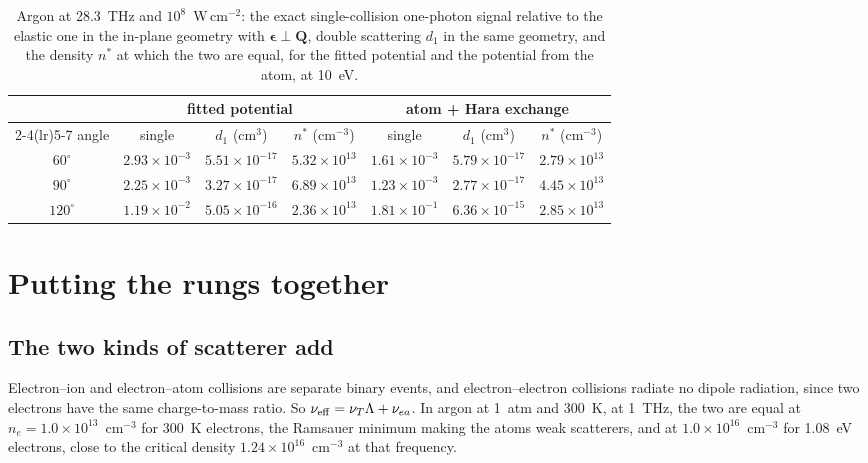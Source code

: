 \documentclass[11pt]{article}
\numberwithin{equation}{section}
\newcommand{\nueff}{\nu_{\rm eff}}
\begin{document}
\begin{table}[ht]
\caption{Argon at 28.3~THz and $10^8$~W\,cm$^{-2}$: the exact single-collision one-photon signal
relative to the elastic one in the in-plane geometry with $\boldsymbol\epsilon\perp\mathbf Q$, double
scattering $d_1$ in the same geometry, and the density $n^*$ at which the two are equal, for the
fitted potential and the potential from the atom, at 10~eV.}
\label{tab:onetwo}
\begin{center}
\begin{tabular}{ccccccc}
\toprule
& \multicolumn{3}{c}{fitted potential} & \multicolumn{3}{c}{atom + Hara exchange}\\
\cmidrule(lr){2-4}\cmidrule(lr){5-7}
angle & single & $d_1$ (cm$^3$) & $n^*$ (cm$^{-3}$) & single & $d_1$ (cm$^3$) & $n^*$ (cm$^{-3}$)\\
\midrule
$60^\circ$ & $2.93\times10^{-3}$ & $5.51\times10^{-17}$ & $5.32\times10^{13}$ & $1.61\times10^{-3}$ & $5.79\times10^{-17}$ & $2.79\times10^{13}$\\
$90^\circ$ & $2.25\times10^{-3}$ & $3.27\times10^{-17}$ & $6.89\times10^{13}$ & $1.23\times10^{-3}$ & $2.77\times10^{-17}$ & $4.45\times10^{13}$\\
$120^\circ$ & $1.19\times10^{-2}$ & $5.05\times10^{-16}$ & $2.36\times10^{13}$ & $1.81\times10^{-1}$ & $6.36\times10^{-15}$ & $2.85\times10^{13}$\\
\bottomrule
\end{tabular}
\end{center}
\end{table}

\section{Putting the rungs together}
\label{sec:standard}

\subsection{The two kinds of scatterer add}
\label{sec:add}
Electron--ion and electron--atom collisions are separate binary events, and
electron--electron collisions radiate no dipole radiation, since two electrons have the same
charge-to-mass ratio. So $\nueff=\nu_T\Lambda+\nu_{ea}$. In argon at 1~atm and 300~K, at 1~THz,
the two are equal at $n_e=1.0\times10^{13}$~cm$^{-3}$ for 300~K electrons, the Ramsauer minimum
making the atoms weak scatterers, and at $1.0\times10^{16}$~cm$^{-3}$ for 1.08~eV electrons, close
to the critical density $1.24\times10^{16}$~cm$^{-3}$ at that frequency.
\end{document}
